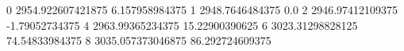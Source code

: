 0 2954.922607421875 6.157958984375
1 2948.7646484375 0.0
2 2946.97412109375 -1.79052734375
4 2963.99365234375 15.22900390625
6 3023.31298828125 74.54833984375
8 3035.057373046875 86.292724609375
